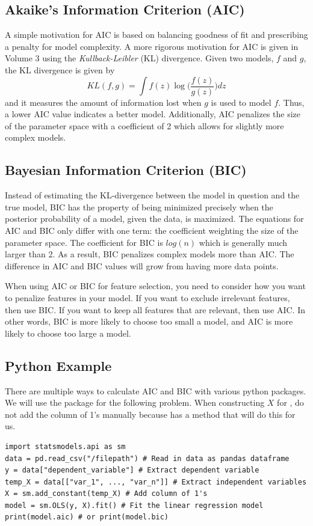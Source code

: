 \subsection*{Akaike's Information Criterion (AIC)}
A simple motivation for AIC is based on balancing goodness of fit and prescribing a penalty for model complexity. 
A more rigorous motivation for AIC is given in Volume 3 using the \textit{Kullback-Leibler} (KL) divergence. 
Given two models, $f$ and $g$, the KL divergence is given by \[ KL(f,g) = \int f(z)\log \bigg(\frac{f(z)}{g(z)} \bigg)dz \] and it measures the amount of information lost when $g$ is used to model $f$. 
Thus, a lower AIC value indicates a better model.
Additionally, AIC penalizes the size of the parameter space with a coefficient of 2 which allows for slightly more complex models.


\subsection*{Bayesian Information Criterion (BIC)}  
Instead of estimating the KL-divergence between the model in question and the true model, BIC has the property of being minimized precisely when the posterior probability of a model, given the data, is maximized.
The equations for AIC and BIC only differ with one term: the coefficient weighting the size of the parameter space. The coefficient for BIC is $log(n)$ which is generally much larger than 2. 
As a result, BIC penalizes complex models more than AIC. The difference in AIC and BIC values will grow from having more data points. 

When using AIC or BIC for feature selection, you need to consider how you want to penalize features in your model. 
If you want to exclude irrelevant features, then use BIC. If you want to keep all features that are relevant, then use AIC. 
In other words, BIC is more likely to choose too small a model, and AIC is more likely to choose too large a model.

\subsection*{Python Example}
There are multiple ways to calculate AIC and BIC with various python packages.
We will use the package  for the following problem. 
When constructing $X$ for , do not add the column of 1's manually because  has a method that will do this for us.
\begin{lstlisting}
import statsmodels.api as sm
data = pd.read_csv("/filepath") # Read in data as pandas dataframe
y = data["dependent_variable"] # Extract dependent variable 
temp_X = data[["var_1", ..., "var_n"]] # Extract independent variables 
X = sm.add_constant(temp_X) # Add column of 1's
model = sm.OLS(y, X).fit() # Fit the linear regression model
print(model.aic) # or print(model.bic)
\end{lstlisting} 

